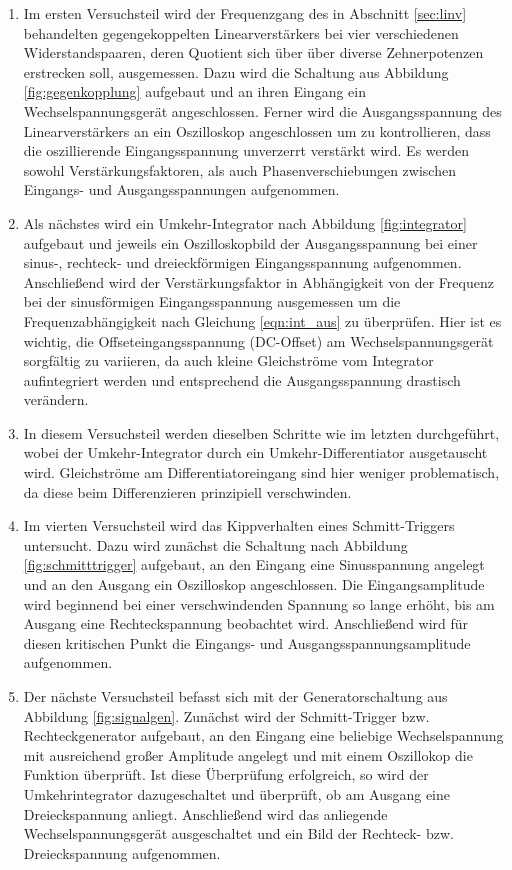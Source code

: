 \begin{enumerate}
  \item Im ersten Versuchsteil wird der Frequenzgang des in Abschnitt \ref{sec:linv} behandelten gegengekoppelten
  Linearverstärkers bei vier verschiedenen Widerstandspaaren, deren Quotient sich über über diverse
  Zehnerpotenzen erstrecken soll, ausgemessen. Dazu wird die Schaltung aus Abbildung \ref{fig:gegenkopplung} aufgebaut
  und an ihren Eingang ein Wechselspannungsgerät angeschlossen. Ferner wird die Ausgangsspannung des Linearverstärkers
  an ein Oszilloskop angeschlossen um zu kontrollieren, dass die oszillierende Eingangsspannung unverzerrt
  verstärkt wird. Es werden sowohl Verstärkungsfaktoren, als auch Phasenverschiebungen zwischen Eingangs-
  und Ausgangsspannungen aufgenommen.

  \item Als nächstes wird ein Umkehr-Integrator nach Abbildung \ref{fig:integrator} aufgebaut und jeweils ein
  Oszilloskopbild der Ausgangsspannung bei einer sinus-, rechteck- und dreieckförmigen Eingangsspannung aufgenommen.
  Anschließend wird der Verstärkungsfaktor in Abhängigkeit von der Frequenz bei der sinusförmigen Eingangsspannung
  ausgemessen um die Frequenzabhängigkeit nach Gleichung \eqref{eqn:int_aus} zu überprüfen.
  Hier ist es wichtig, die Offseteingangsspannung (DC-Offset) am Wechselspannungsgerät sorgfältig zu variieren, da
  auch kleine Gleichströme vom Integrator aufintegriert werden und entsprechend die Ausgangsspannung
  drastisch verändern.

  \item In diesem Versuchsteil werden dieselben Schritte wie im letzten durchgeführt, wobei der Umkehr-Integrator
  durch ein Umkehr-Differentiator ausgetauscht wird.
  Gleichströme am Differentiatoreingang sind hier weniger problematisch, da diese beim Differenzieren prinzipiell
  verschwinden.

  \item Im vierten Versuchsteil wird das Kippverhalten eines Schmitt-Triggers untersucht. Dazu wird
  zunächst die Schaltung nach Abbildung \ref{fig:schmitttrigger} aufgebaut, an den Eingang eine
  Sinusspannung angelegt und an den Ausgang ein Oszilloskop angeschlossen. Die Eingangsamplitude
  wird beginnend bei einer verschwindenden Spannung so lange erhöht, bis am Ausgang eine Rechteckspannung
  beobachtet wird. Anschließend wird für diesen kritischen Punkt die Eingangs- und Ausgangsspannungsamplitude
  aufgenommen.

  \item Der nächste Versuchsteil befasst sich mit der Generatorschaltung aus Abbildung \ref{fig:signalgen}.
  Zunächst wird der Schmitt-Trigger bzw. Rechteckgenerator aufgebaut, an den Eingang eine beliebige Wechselspannung mit ausreichend
  großer Amplitude angelegt und mit einem Oszillokop die Funktion überprüft. Ist diese Überprüfung erfolgreich, so
  wird der Umkehrintegrator dazugeschaltet und überprüft, ob am Ausgang eine Dreieckspannung anliegt. Anschließend
  wird das anliegende Wechselspannungsgerät ausgeschaltet und ein Bild der Rechteck- bzw. Dreieckspannung aufgenommen.


\end{enumerate}
